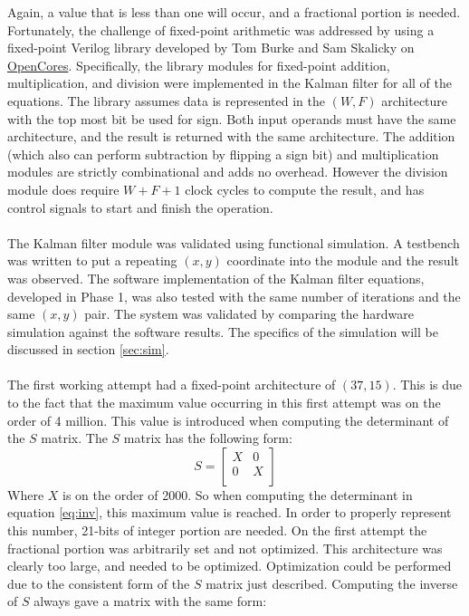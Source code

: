 \documentclass[11pt]{article} %
\begin{document}
Again, a value that is less than one will occur, and a fractional portion is needed. Fortunately, the challenge of fixed-point arithmetic was addressed by using a fixed-point Verilog library developed by Tom Burke and Sam Skalicky on \href{http://opencores.org/websvn,filedetails?repname=verilog_fixed_point_math_library&path=%2Fverilog_fixed_point_math_library%2Ftrunk%2FReadMe.txt}{OpenCores}. Specifically, the library modules for fixed-point addition, multiplication, and division were implemented in the Kalman filter for all of the equations. The library assumes data is represented in the $(W,F)$ architecture with the top most bit be used for sign. Both input operands must have the same architecture, and the result is returned with the same architecture. The addition (which also can perform subtraction by flipping a sign bit) and multiplication modules are strictly combinational and adds no overhead. However the division module does require $W+F+1$ clock cycles to compute the result, and has control signals to start and finish the operation. \\\\
The Kalman filter module was validated using functional simulation. A testbench was written to put a repeating $(x,y)$ coordinate into the module and the result was observed. The software implementation of the Kalman filter equations, developed in Phase 1, was also tested with the same number of iterations and the same $(x,y)$ pair. The system was validated by comparing the hardware simulation against the software results. The specifics of the simulation will be discussed in section \ref{sec:sim}. \\\\ 
The first working attempt had a fixed-point architecture of $(37, 15)$. This is due to the fact that the maximum value occurring in this first attempt was on the order of 4 million. This value is introduced when computing the determinant of the $S$ matrix. The $S$ matrix has the following form:
\begin{equation}
S = 
\begin{bmatrix}
X & 0 \\
0 & X \\
\end{bmatrix}
\end{equation}
Where $X$ is on the order of 2000. So when computing the determinant in equation \ref{eq:inv}, this maximum value is reached. In order to properly represent this number, 21-bits of integer portion are needed. On the first attempt the fractional portion was arbitrarily set and not optimized. This architecture was clearly too large, and needed to be optimized. Optimization could be performed due to the consistent form of the $S$ matrix just described. Computing the inverse of $S$ always gave a matrix with the same form:
\end{document}
